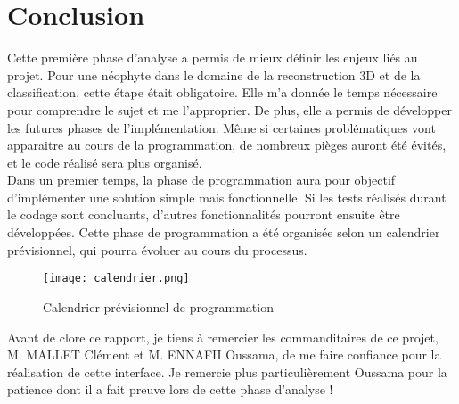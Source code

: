 \documentclass{themeensg}
\begin{document}




\newpage
\chapter*{Conclusion}
  \vspace{1.5cm}
Cette première phase d'analyse a permis de mieux définir les enjeux liés au projet. Pour une néophyte dans le domaine de la reconstruction 3D et de la classification, cette  étape était obligatoire. Elle m'a donnée le temps nécessaire pour comprendre le sujet et me l'approprier. De plus, elle a permis de développer les futures phases de l'implémentation. Même si certaines problématiques vont apparaitre au cours de la programmation, de nombreux pièges auront été évités, et le code réalisé sera plus organisé.\\

Dans un premier temps, la phase de programmation aura pour objectif d'implémenter une solution simple mais fonctionnelle. Si les tests réalisés durant le codage sont concluants, d'autres fonctionnalités pourront ensuite être développées. Cette phase de programmation a été organisée selon un calendrier prévisionnel, qui pourra évoluer au cours du processus. \\

\begin{figure}[!h]
	\begin{center}
		\texttt{[image: calendrier.png]}  \\
		\caption[Calendrier prévisionnel de programmation]{Calendrier prévisionnel de programmation}
		\label{fig:calendrier}
	\end{center}
\end{figure}

Avant de clore ce rapport, je tiens à remercier les commanditaires de ce projet, M. MALLET Clément et M. ENNAFII Oussama, de me faire confiance pour la réalisation de cette interface. Je remercie plus particulièrement Oussama pour la patience dont il a fait preuve lors de cette phase d'analyse ! 


\newpage
\listoffigures

\end{document}

